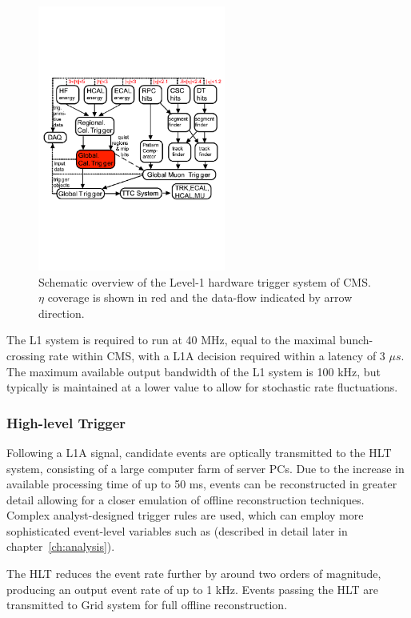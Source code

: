 \begin{figure}[ht!]
  \centering
  \includegraphics[width = 0.55\textwidth]{Figs/machine/L1_diagram.pdf}
  \caption{Schematic overview of the Level-1 hardware trigger system of CMS. $
  \eta$ coverage is shown in red and the data-flow indicated by arrow 
  direction.}
  \label{fig:l1_diagram}
\end{figure}

The L1 system is required to run at 40 MHz, equal to the maximal bunch-crossing
rate within CMS, with a L1A decision required within a latency of 3 $\mu s$. The
maximum available output bandwidth of the L1 system is 100 kHz, but typically is
maintained at a lower value to allow for stochastic rate fluctuations.

\subsubsection{High-level Trigger}

Following a L1A signal, candidate events are optically transmitted to the HLT 
system, consisting of a large computer farm of server 
PCs. Due to the increase in available processing time of up to 50 ms, events can
be reconstructed in greater detail allowing for a closer emulation of offline 
reconstruction techniques. Complex analyst-designed trigger rules are used, 
which can employ more sophisticated event-level variables such as \alphat
(described in detail later in chapter~\ref{ch:analysis}).

The HLT reduces the event rate further by around two orders of magnitude,
producing an output event rate of up to 1 kHz. Events passing the HLT are
transmitted to Grid system \cite{Eck:840543} for full offline reconstruction.
